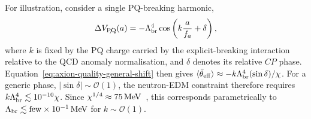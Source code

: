 \documentclass[review]{elsarticle}
\numberwithin{equation}{section}
\numberwithin{table}{section}
\numberwithin{figure}{section}
\begin{document}
For illustration, consider a single PQ-breaking harmonic,
\begin{align}
    \Delta V_{\slashed{\rm PQ}}(a)
    =
    -\Lambda_{\rm br}^4
    \cos\left(
        k\frac{a}{f_a}+\delta
    \right),
    \label{eq:axion-quality-breaking-harmonic}
\end{align}
where $k$ is fixed by the PQ charge carried by the explicit-breaking interaction relative to the QCD anomaly normalisation, and $\delta$ denotes its relative $CP$ phase. Equation~\eqref{eq:axion-quality-general-shift} then gives $\langle\bar\theta_{\rm eff}\rangle\approx -k\Lambda_{\rm br}^4(\sin\delta)/\chi$. For a generic phase, $|\sin\delta|\sim\mathcal{O}(1)$, the neutron-EDM constraint therefore requires $k\Lambda_{\rm br}^4\lesssim 10^{-10}\chi$. 
Since $\chi^{1/4}\approx 75\,{\rm MeV}$~\cite{GrilliDiCortona:2015jxo,Gorghetto:2018ocs}, this corresponds parametrically to $\Lambda_{\rm br}\lesssim{\rm few}\times10^{-1}\,{\rm MeV}$ for $k\sim\mathcal{O}(1)$. 
\end{document}
